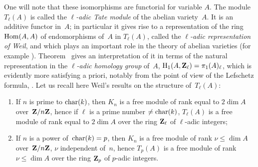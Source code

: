 One will note that these isomorphisms are functorial for variable $A$. The
module $T_\ell(A)$ is called the \emph{$\ell$-adic Tate
module} of the abelian variety~$A$. It is an
additive functor in~$A$; in particular it gives rise to a
representation of the ring $\operatorname{Hom}(A,A)$ of endomorphisms of~$A$
in $T_\ell(A)$, called the \emph{$\ell$-adic representation
of Weil}, and which plays an important role in the theory of
abelian varieties (\cf for example \hbox{\cite[Chap~VII]{XI.4}}).
Theorem~ gives an interpretation of it in
terms of the natural representation in the \emph{$\ell$-adic homology
group} of~$A$, $\operatorname{H}_1(A,\mathbf{Z}_\ell)=\pi_1(A)_\ell$,
which
is evidently more satisfying a priori, notably from the point of view
of the Lefschetz formula, \cite[Chap~V]{XI.4}. Let us recall here
Weil's results on the structure of~$T_\ell(A)$:
\begin{enumerate}
\item[a)] If $n$ is prime to $\operatorname{char}(k)$, then $K_n$ is a free
module of rank equal to $2\dim A$ over~$\mathbf{Z}/n\mathbf{Z}$, hence if $\ell$
is a prime number $\neq \operatorname{char}(k)$, $T_\ell(A)$ is a free module
of rank equal to $2\dim A$ over the ring $\mathbf{Z}_\ell$ of
$\ell$-adic integers;
\item[b)] If $n$ is a power of~$\operatorname{char}(k)=p$, then $K_n$ is a
free module of rank $\nu\leq\dim A$ over~$\mathbf{Z}/n\mathbf{Z}$, $\nu$
independent of~$n$, hence $T_p(A)$ is a free module of rank
$\nu\leq \dim A$ over the ring $\mathbf{Z}_p$ of $p$-adic integers.
\end{enumerate}

